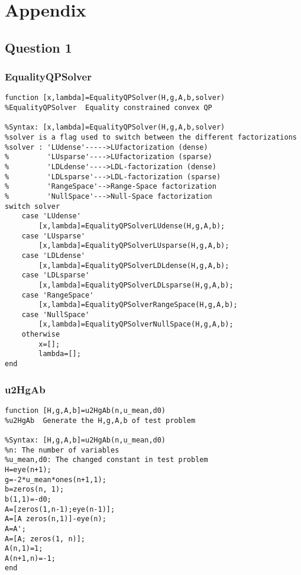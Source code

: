 \section{ \bfseries Appendix}
\subsection{\bfseries Question 1 }

\subsubsection{\bfseries EqualityQPSolver }
\label{6.1.1}
{\setmainfont{Courier New Bold} \scriptsize         
\begin{lstlisting}
function [x,lambda]=EqualityQPSolver(H,g,A,b,solver)
%EqualityQPSolver  Equality constrained convex QP

%Syntax: [x,lambda]=EqualityQPSolver(H,g,A,b,solver)
%solver is a flag used to switch between the different factorizations
%solver : 'LUdense'----->LUfactorization (dense)
%         'LUsparse'---->LUfactorization (sparse)
%         'LDLdense'---->LDL-factorization (dense)
%         'LDLsparse'--->LDL-factorization (sparse)
%         'RangeSpace'-->Range-Space factorization
%         'NullSpace'--->Null-Space factorization
switch solver
    case 'LUdense'
        [x,lambda]=EqualityQPSolverLUdense(H,g,A,b);
    case 'LUsparse'
        [x,lambda]=EqualityQPSolverLUsparse(H,g,A,b);
    case 'LDLdense'
        [x,lambda]=EqualityQPSolverLDLdense(H,g,A,b);
    case 'LDLsparse'
        [x,lambda]=EqualityQPSolverLDLsparse(H,g,A,b);
    case 'RangeSpace'
        [x,lambda]=EqualityQPSolverRangeSpace(H,g,A,b);
    case 'NullSpace'
        [x,lambda]=EqualityQPSolverNullSpace(H,g,A,b);
    otherwise 
        x=[];
        lambda=[];
end
\end{lstlisting}}
\subsubsection{\bfseries u2HgAb }
\label{6.1.2}
{\setmainfont{Courier New Bold} \scriptsize         
\begin{lstlisting}
function [H,g,A,b]=u2HgAb(n,u_mean,d0)
%u2HgAb  Generate the H,g,A,b of test problem

%Syntax: [H,g,A,b]=u2HgAb(n,u_mean,d0)
%n: The number of variables
%u_mean,d0: The changed constant in test problem
H=eye(n+1);
g=-2*u_mean*ones(n+1,1);
b=zeros(n, 1);
b(1,1)=-d0;
A=[zeros(1,n-1);eye(n-1)];
A=[A zeros(n,1)]-eye(n);
A=A';
A=[A; zeros(1, n)];
A(n,1)=1;
A(n+1,n)=-1;
end
\end{lstlisting}}

